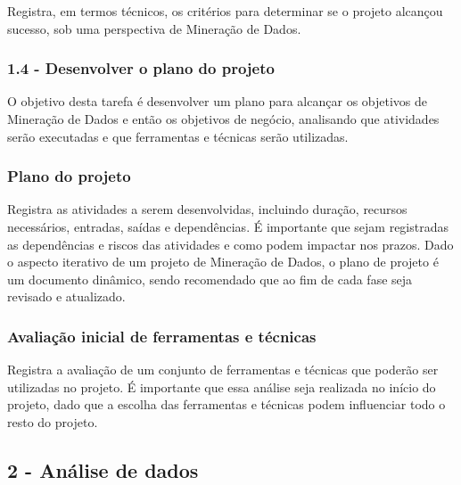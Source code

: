 Registra, em termos técnicos, os critérios para determinar se o projeto alcançou sucesso, sob uma perspectiva de Mineração de Dados.

\subsubsection*{\textbf{1.4 - Desenvolver o plano do projeto}}

O objetivo desta tarefa é desenvolver um plano para alcançar os objetivos de Mineração de Dados e então os objetivos de negócio, analisando que atividades serão executadas e que ferramentas e técnicas serão utilizadas.

\subsubsection*{Plano do projeto}

Registra as atividades a serem desenvolvidas, incluindo duração, recursos necessários, entradas, saídas e dependências. É importante que sejam registradas as dependências e riscos das atividades e como podem impactar nos prazos.
Dado o aspecto iterativo de um projeto de Mineração de Dados, o plano de projeto é um documento dinâmico, sendo recomendado que ao fim de cada fase seja revisado e atualizado.

\subsubsection*{Avaliação inicial de ferramentas e técnicas}

Registra a avaliação de um conjunto de ferramentas e técnicas que poderão ser utilizadas no projeto. É importante que essa análise seja realizada no início do projeto, dado que a escolha das ferramentas e técnicas podem influenciar todo o resto do projeto.

\newpage 

\subsection*{2 - Análise de dados}


